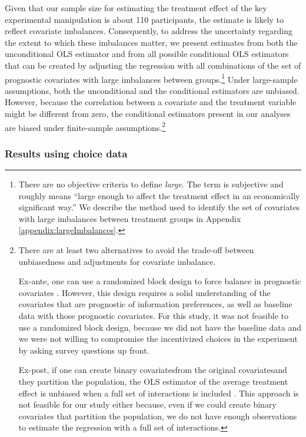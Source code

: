 Given that our sample size for estimating the treatment effect of the key experimental manipulation is about 110 participants, the estimate is likely to reflect covariate imbalances. Consequently, to address the uncertainty regarding the extent to which these imbalances matter, we present estimates from both the unconditional OLS estimator and from all possible conditional OLS estimators that can be created by adjusting the regression with all combinations of the set of prognostic covariates with large imbalances between groups.\footnote{There are no objective criteria to define \emph{large}. The term is subjective and roughly means \enquote{large enough to affect the treatment effect in an economically significant way.} We describe the method used to identify the set of covariates with large imbalances between treatment groups in Appendix \ref{appendix:largeImbalances}.} Under large-sample assumptions, both the unconditional and the conditional estimators are unbiased. However, because the correlation between a covariate and the treatment variable might be different from zero, the conditional estimators present in our analyses are biased under finite-sample assumptions.\footnote{There are at least two alternatives to avoid the trade-off between unbiasedness and adjustments for covariate imbalance.

Ex-ante, one can use a randomized block design to force balance in prognostic covariates \citet{atheyChapterEconometricsRandomized2017}. However, this design requires a solid understanding of the covariates that are prognostic of information preferences, as well as baseline data with those prognostic covariates. For this study, it was not feasible to use a randomized block design, because we did not have the baseline data and we were not willing to compromise the incentivized choices in the experiment by asking survey questions up front.

Ex-post, if one can create binary covariates\textemdash from the original covariates\textemdash and they partition the population, the OLS estimator of the average treatment effect is unbiased when a full set of interactions is included \citep{linAgnosticNotesRegression2013,atheyChapterEconometricsRandomized2017}. This approach is not feasible for our study either because, even if we could create binary covariates that partition the population, we do not have enough observations to estimate the regression with a full set of interactions.
}

\subsubsection{Results using choice data}

